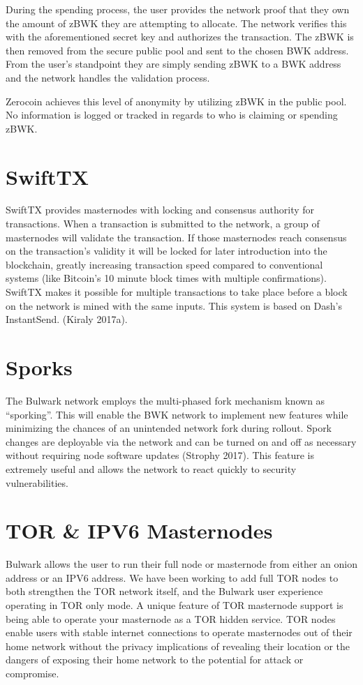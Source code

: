 \documentclass[11pt,a4paperpaper,]{report}
\begin{document}
During the spending process, the user provides the network proof that
they own the amount of zBWK they are attempting to allocate. The network
verifies this with the aforementioned secret key and authorizes the
transaction. The zBWK is then removed from the secure public pool and
sent to the chosen BWK address. From the user's standpoint they are
simply sending zBWK to a BWK address and the network handles the
validation process.

Zerocoin achieves this level of anonymity by utilizing zBWK in the
public pool. No information is logged or tracked in regards to who is
claiming or spending zBWK.

\section{SwiftTX}\label{swifttx}

SwiftTX provides masternodes with locking and consensus authority for
transactions. When a transaction is submitted to the network, a group of
masternodes will validate the transaction. If those masternodes reach
consensus on the transaction's validity it will be locked for later
introduction into the blockchain, greatly increasing transaction speed
compared to conventional systems (like Bitcoin's 10 minute block times
with multiple confirmations). SwiftTX makes it possible for multiple
transactions to take place before a block on the network is mined with
the same inputs. This system is based on Dash's InstantSend. (Kiraly
2017a).

\section{Sporks}\label{sporks}

The Bulwark network employs the multi-phased fork mechanism known as
``sporking''. This will enable the BWK network to implement new features
while minimizing the chances of an unintended network fork during
rollout. Spork changes are deployable via the network and can be turned
on and off as necessary without requiring node software updates (Strophy
2017). This feature is extremely useful and allows the network to react
quickly to security vulnerabilities.

\section{TOR \& IPV6 Masternodes}\label{tor-ipv6-masternodes}

Bulwark allows the user to run their full node or masternode from either
an onion address or an IPV6 address. We have been working to add full
TOR nodes to both strengthen the TOR network itself, and the Bulwark
user experience operating in TOR only mode. A unique feature of TOR
masternode support is being able to operate your masternode as a TOR
hidden service. TOR nodes enable users with stable internet connections
to operate masternodes out of their home network without the privacy
implications of revealing their location or the dangers of exposing
their home network to the potential for attack or compromise.
\end{document}

